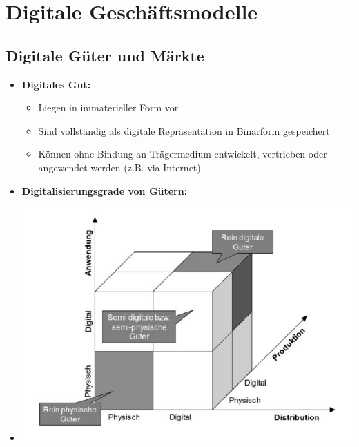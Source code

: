 \documentclass[12pt,a4paper]{article}
\author{Pauline Speckmann}
\begin{document}
\setcounter{section}{5}
\section{Digitale Geschäftsmodelle}


\vspace*{1cm}
\subsection{Digitale Güter und Märkte} %
\begin{itemize}
   \item \textbf{Digitales Gut:}
         \begin{itemize}
            \item Liegen in immaterieller Form vor
            \item Sind vollständig als digitale Repräsentation in Binärform gespeichert
            \item Können ohne Bindung an Trägermedium entwickelt, vertrieben oder angewendet werden (z.B. via Internet)
         \end{itemize}

   \item \textbf{Digitalisierungsgrade von Gütern:}
   \item[] \includegraphics[scale=0.35]{wuerfel.png}
   

\end{itemize}
\end{document}

